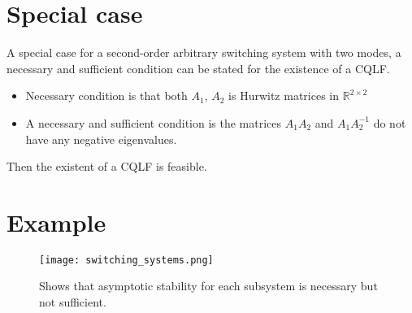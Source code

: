\section{Special case}
A special case for a second-order arbitrary switching system with two modes, a necessary and sufficient condition can be
stated for the existence of a CQLF.
\begin{itemize}
  \item Necessary condition is that both $A_1$, $A_2$ is Hurwitz matrices in $\mathbb{R}^{2\times2}$
  \item A necessary and sufficient condition is the matrices $A_1A_2$ and $A_1A_2^{-1}$ do not have any negative
    eigenvalues.
\end{itemize}
Then the existent of a CQLF is feasible.

\section{Example}
\begin{figure}[H]
  \centering
    \texttt{[image: switching\_systems.png]}
  \caption{Shows that asymptotic stability for each subsystem is necessary but not sufficient.}
  \label{fig:switching_systems}
\end{figure}
